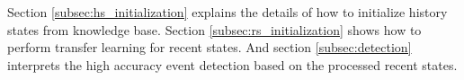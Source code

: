 \documentclass{article}
\begin{document}
Section \ref{subsec:hs_initialization} explains the details of how to initialize history states from knowledge base.
Section \ref{subsec:rs_initialization} shows how to perform transfer learning for recent states.
And section \ref{subsec:detection} interprets the high accuracy event detection based on the processed recent states.

\end{document}

